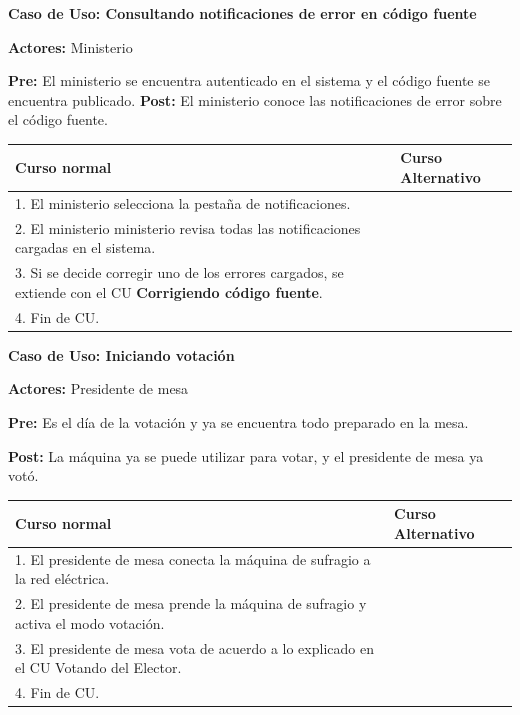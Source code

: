 \textbf{Caso de Uso: Consultando notificaciones de error en código fuente}

\textbf{Actores:} Ministerio 

\textbf{Pre:} El ministerio se encuentra autenticado en el sistema y el código fuente se encuentra publicado.
\textbf{Post:} El ministerio conoce las notificaciones de error sobre el código fuente.


\begin{table}[h!]
	
 \begin{tabular}{|p{7.5cm} | p{7.5cm}|} 
 \hline
 \textbf{Curso normal} & \textbf{Curso Alternativo} \\
 \hline


1. El ministerio selecciona la pestaña de notificaciones. & \\
\hline


2. El ministerio ministerio revisa todas las notificaciones cargadas en el sistema. & \\
\hline


3. Si se decide corregir uno de los errores cargados, se extiende con el CU \textbf{Corrigiendo código fuente}. & \\
\hline


4. Fin de CU. & \\
\hline




 \end{tabular}

\end{table}



\textbf{Caso de Uso: Iniciando votación}

\textbf{Actores:} Presidente de mesa

\textbf{Pre:} Es el día de la votación y ya se encuentra todo preparado en la mesa.

\textbf{Post:} La máquina ya se puede utilizar para votar, y el presidente de mesa ya votó.

\begin{table}[h!]
	
 \begin{tabular}{|p{7.5cm} | p{7.5cm}|} 
 \hline
 \textbf{Curso normal} & \textbf{Curso Alternativo} \\
 \hline

1. El presidente de mesa conecta la máquina de sufragio a la red eléctrica. & \\
\hline
2. El presidente de mesa prende la máquina de sufragio y activa el modo votación. & \\
\hline
3. El presidente de mesa vota de acuerdo a lo explicado en el CU Votando del Elector. & \\
\hline
4. Fin de CU.& \\
\hline



 \end{tabular}

\end{table}



